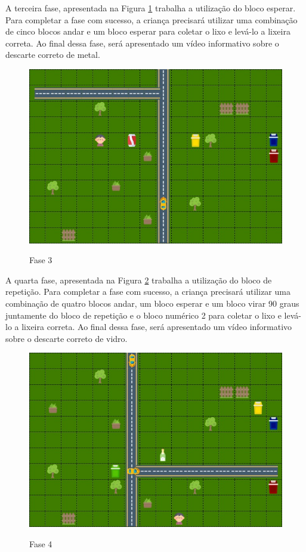     A terceira fase, apresentada na Figura \ref{figura:fase_3} trabalha a utilização do bloco esperar. Para completar a fase com sucesso, a criança precisará utilizar uma combinação de cinco blocos andar e um bloco esperar para coletar o lixo e levá-lo a lixeira correta. Ao final dessa fase, será apresentado um vídeo informativo sobre o descarte correto de metal.
    
    \begin{figure}[H]
        \caption{Fase 3}
        \centering
        \includegraphics[width=12cm]{Imagens/Cap3/Fases/Fase3.jpg}
        \label{figura:fase_3}
    \end{figure}
    
    A quarta fase, apresentada na Figura \ref{figura:fase_4} trabalha a utilização do bloco de repetição. Para completar a fase com sucesso, a criança precisará utilizar uma combinação de quatro blocos andar, um bloco esperar e um bloco virar 90 graus juntamente do bloco de repetição e o bloco numérico 2 para coletar o lixo e levá-lo a lixeira correta. Ao final dessa fase, será apresentado um vídeo informativo sobre o descarte correto de vidro.
    
    \begin{figure}[H]
        \caption{Fase 4}
        \centering
        \includegraphics[width=12cm]{Imagens/Cap3/Fases/Fase4.jpg}
        \label{figura:fase_4}
    \end{figure}
    
